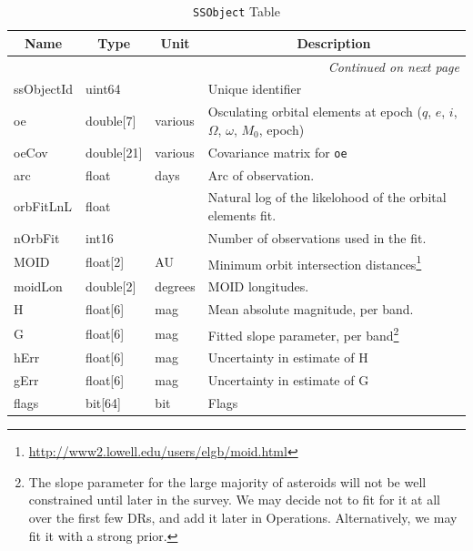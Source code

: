 \documentclass[12pt]{article}
\newcommand{\code}[1]{\texttt{#1}}
\newcommand{\SSObject}{\code{SSObject}\xspace}
\begin{document}
\begin{center}
\begin{longtable}{p{3cm}p{2cm}p{2cm}p{5cm}}
\caption[\SSObject Table]{\SSObject Table} \\

\hline \multicolumn{1}{c}{\bf Name} & \multicolumn{1}{c}{\bf Type} &
\multicolumn{1}{c}{\bf Unit} & \multicolumn{1}{c}{\bf Description} \\ \hline

\endhead

\hline \multicolumn{4}{r}{{\em Continued on next page}} \\
\endfoot

\hline\hline
\endlastfoot

ssObjectId & uint64 & ~ & Unique identifier \\ 

oe & double[7] & various & Osculating orbital elements at epoch ($q$, $e$,
$i$, $\Omega$, $\omega$, $M_0$, epoch) \\

oeCov & double[21] & various & Covariance matrix for \texttt{oe} \\

arc & float & days & Arc of observation. \\

orbFitLnL & float & ~ & Natural log of the likelohood of the orbital elements fit. \\

nOrbFit & int16 & ~ & Number of observations used in the fit. \\

MOID & float[2] & AU & Minimum orbit intersection
distances\footnote{\url{http://www2.lowell.edu/users/elgb/moid.html}} \\

moidLon & double[2] & degrees & MOID longitudes. \\

H & float[6] & mag & Mean absolute magnitude, per band. \\

G & float[6] & mag & Fitted slope parameter, per band\footnote{The slope
parameter for the large majority of asteroids will not be well constrained
until later in the survey. We may decide not to fit for it at all over the
first few DRs, and add it later in Operations. Alternatively, we may fit it
with a strong prior.} \\

hErr & float[6] & mag & Uncertainty in estimate of H \\

gErr & float[6] & mag & Uncertainty in estimate of G \\

flags & bit[64] & bit & Flags \\ \hline

\end{longtable}
\end{center}
\end{document}
